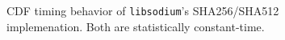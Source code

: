 \begin{figure}[h!]
  \centering
  \label{fig:dudect_sha256}
  \label{fig:dudect_sha512}
  \caption{CDF timing behavior of \texttt{libsodium}'s SHA256/SHA512 implemenation. Both are statistically constant-time.}
  \label{fig:dudect_sha}
\end{figure}

